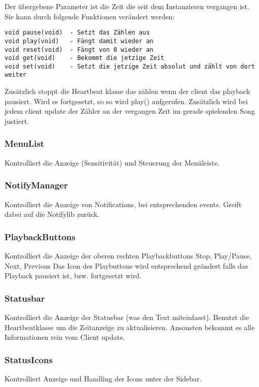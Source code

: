 Der übergebene Parameter ist die Zeit die seit dem Instanzieren vergangen ist. 
Sie kann durch folgende Funktionen verändert werden:
\begin{verbatim}
void pause(void)  - Setzt das Zählen aus
void play(void)   - Fängt damit wieder an
void reset(void)  - Fängt von 0 wieder an
void get(void)    - Bekommt die jetzige Zeit
void set(void)    - Setzt die jetzige Zeit absolut und zählt von dort weiter
\end{verbatim}

Zusätzlich stoppt die Heartbeat klasse das zählen wenn der client das playback pausiert.
Wird es fortgesetzt, so so wird play() aufgerufen. 
Zusätzlich wird bei jedem client update der Zähler an der vergangen Zeit im gerade spielenden Song justiert.

\subsubsection{MenuList}
Kontrolliert die Anzeige (Sensitivität) und Steuerung der Menüleiste.

\subsubsection{NotifyManager}
Kontrolliert die Anzeige von Notifications, bei entsprechenden events.
Greift dabei auf die Notifylib zurück.

\subsubsection{PlaybackButtons}
Kontrolliert die Anzeige der oberen rechten Playbackbuttons Stop, Play/Pause, Next, Previous
Das Icon des Playbuttons wird entsprechend geändert falls das Playback pausiert ist,
bzw. fortgesetzt wird.

\subsubsection{Statusbar}
Kontrolliert die Anzeige der Statusbar (was den Text miteinfasst). 
Benutzt die Heartbeatklasse um die Zeitanzeige zu aktualisieren. Ansonsten bekommt es alle Informationen rein vom Client update.

\subsubsection{StatusIcons}
Kontrolliert Anzeige und Handling der Icons unter der Sidebar.

